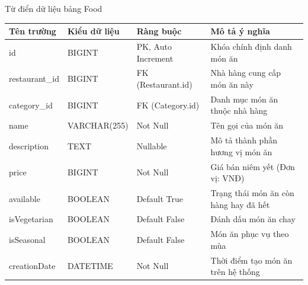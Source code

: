 \documentclass{uetgraduation}
\begin{document}
\begin{table}[!htbp]{Từ điển dữ liệu bảng Food}
\centering
\small
\begin{tabularx}{\textwidth}{|>{\raggedright\arraybackslash}p{2.8cm}|>{\raggedright\arraybackslash}p{3.0cm}|>{\raggedright\arraybackslash}p{3.5cm}|>{\raggedright\arraybackslash}X|}
\hline
\textbf{Tên trường} & \textbf{Kiểu dữ liệu} & \textbf{Ràng buộc} & \textbf{Mô tả ý nghĩa} \\ \hline
id & BIGINT & PK, Auto Increment & Khóa chính định danh món ăn \\ \hline
restaurant\_id & BIGINT & FK (Restaurant.id) & Nhà hàng cung cấp món ăn này \\ \hline
category\_id & BIGINT & FK (Category.id) & Danh mục món ăn thuộc nhà hàng \\ \hline
name & VARCHAR(255) & Not Null & Tên gọi của món ăn \\ \hline
description & TEXT & Nullable & Mô tả thành phần hương vị món ăn \\ \hline
price & BIGINT & Not Null & Giá bán niêm yết (Đơn vị: VNĐ) \\ \hline
available & BOOLEAN & Default True & Trạng thái món ăn còn hàng hay đã hết \\ \hline
isVegetarian & BOOLEAN & Default False & Đánh dấu món ăn chay \\ \hline
isSeasonal & BOOLEAN & Default False & Món ăn phục vụ theo mùa \\ \hline
creationDate & DATETIME & Not Null & Thời điểm tạo món ăn trên hệ thống \\ \hline
\end{tabularx}
\end{table}
\end{document}

